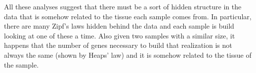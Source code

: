 \FloatBarrier
All these analyses suggest that there must be a sort of hidden structure in the data that is somehow related to the tissue each sample comes from. In particular, there are many Zipf's laws hidden behind the data and each sample is build looking at one of these a time. Also given two samples with a similar size, it happens that the number of genes necessary to build that realization is not always the same (shown by Heaps' law) and it is somehow related to the tissue of the sample.